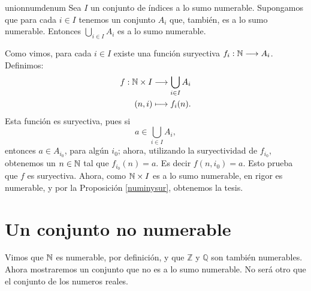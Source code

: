 \begin{proposicion}{unionnumdenum} Sea $I$ un conjunto de índices a lo sumo
numerable. Supongamos que para cada $i\in I$ tenemos un conjunto
$A_i$ que, también, es a lo sumo numerable. Entonces $\bigcup_{i\in I}A_i$
es a lo sumo numerable. 
\end{proposicion}

\begin{demo} Como vimos, para cada $i\in I$ existe una función
suryectiva $f_i:\mathbb{N}\longrightarrow A_i$. Definimos:
\[
\begin{split}
      f:\mathbb{N}\times I & \longrightarrow \bigcup\limits_{i\in I} A_i
      \\
    (n,i) & \longmapsto f_i(n).
         \\
 \end{split}
\]
Esta función es suryectiva, pues si
\[a \in \bigcup\limits_{i\in I} A_i,\]
entonces $a \in A_{i_0} $, para algún $i_0$; 
ahora, utilizando la
suryectividad de $f_{i_0}$, obtenemos un $n \in\mathbb{N}$ tal que
$f_{i_0}(n)=a$. 
Es decir $f(n,i_0)=a$. Esto prueba que $f$  es
suryectiva. Ahora, como $\mathbb{N}\times I$ es a lo sumo numerable, en
rigor es numerable, y por la Proposición \vref{numinysur},
obtenemos la tesis.
\end{demo}


\section{Un conjunto no numerable} 
Vimos que $\mathbb{N}$ es numerable, por definición, y que $\mathbb{Z}$
y $\mathbb{Q}$ son también numerables. Ahora mostraremos un
conjunto que no es a lo sumo numerable. No será otro que el
conjunto de los numeros reales.


